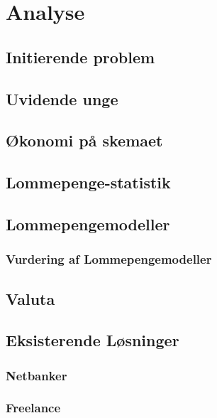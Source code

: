\chapter{Analyse}

\section{Initierende problem}

\section{Uvidende unge}
\label{UvidendeUnge}

\section{Økonomi på skemaet}
\label{Okonomi}

\section{Lommepenge-statistik}
\label{LommeStat}

\section{Lommepengemodeller}
\label{LommeModeller}
\subsection{Vurdering af Lommepengemodeller}
\label{ModelVurdering}

\section{Valuta}
\label{Valuta}

\section{Eksisterende Løsninger}
\subsection{Netbanker}
\subsection{Freelance}
